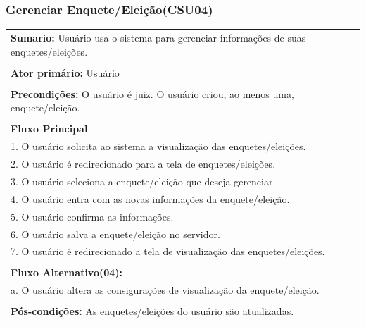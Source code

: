 \documentclass[a4paper,12pt]{report}
\begin{document}
\begin{center}
	{\subsubsection*{Gerenciar Enquete/Eleição(CSU04)}}
\end{center}
\markright{}
\begin{tabularx}{\textwidth}{|X|}\hline
	{\textbf{Sumario:}} Usuário usa o sistema para gerenciar informações de suas enquetes/eleições.\ \ \ \ \ \ \ \ \ \\\\
	{\textbf{Ator primário:}} Usuário \\\\
	{\textbf{Precondições:}} O usuário é juiz. O usuário criou, ao menos uma, enquete/eleição.\\\\
	{\textbf{Fluxo Principal}}\\
	1. O usuário solicita ao sistema a visualização das enquetes/eleições.\\
	2. O usuário é redirecionado para a tela de enquetes/eleições. \\
	3. O usuário seleciona a enquete/eleição que deseja gerenciar. \\
	4. O usuário entra com as novas informações da enquete/eleição.\\
	5. O usuário confirma as informações.\\
	6. O usuário salva a enquete/eleição no servidor.\\
	7. O usuário é redirecionado a tela de visualização das enquetes/eleições.\\\\
	{\textbf{Fluxo Alternativo(04):}}\\
	a. O usuário altera as consigurações de visualização da enquete/eleição.\\\\
	{\textbf{Pós-condições:}} As enquetes/eleições do usuário são atualizadas. \\
	\hline
\end{tabularx}
\end{document}
